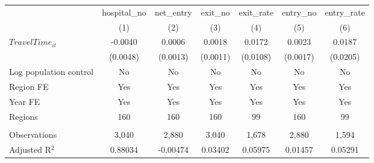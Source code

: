 \begingroup
\centering
\begin{tabular}{lcccccc}
   \toprule
                          & hospital\_no  & net\_entry  & exit\_no  & exit\_rate  & entry\_no  & entry\_rate \\    
                          & (1)           & (2)         & (3)       & (4)         & (5)        & (6)\\  
   \midrule 
   $TravelTime_{it}$      & -0.0040       & 0.0006      & 0.0018    & 0.0172      & 0.0023     & 0.0187\\   
                          & (0.0048)      & (0.0013)    & (0.0011)  & (0.0108)    & (0.0017)   & (0.0205)\\   
   Log population control & No            & No          & No        & No          & No         & No\\  
   Region FE              & Yes           & Yes         & Yes       & Yes         & Yes        & Yes\\  
   Year FE                & Yes           & Yes         & Yes       & Yes         & Yes        & Yes\\  
   Regions                & 160           & 160         & 160       & 99          & 160        & 99\\  
    \\
   Observations           & 3,040         & 2,880       & 3,040     & 1,678       & 2,880      & 1,594\\  
   Adjusted R$^2$         & 0.88034       & -0.00474    & 0.03402   & 0.05975     & 0.01457    & 0.05291\\  
   \bottomrule
\end{tabular}
\par\endgroup
